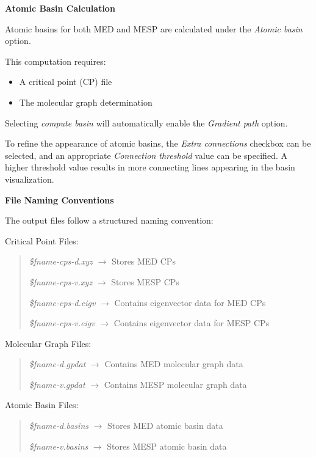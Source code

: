 \documentclass[10pt]{article}
\begin{document}
\vspace*{3mm}
{\bf Atomic Basin Calculation}
\vspace*{3mm}

Atomic basins
for both MED and MESP are calculated under the {\it Atomic basin} option.

This computation requires:

\begin{itemize}
\item A critical point (CP) file
\item The molecular graph determination
\end{itemize}

Selecting {\it compute basin} will automatically enable the {\it Gradient path} option.

To refine the appearance of atomic basins,
the {\it Extra connections} checkbox can be selected,
and an appropriate {\it Connection threshold} value can be specified.
A higher threshold value results in more connecting lines appearing in the basin visualization.

\vspace*{3mm}
{\bf File Naming Conventions}
\vspace*{3mm}

The output files follow a structured naming convention:

\begin{itemize}
\item Critical Point Files:
\vspace*{-5mm}
\begin{quote}
\item {\it \$fname-cps-d.xyz} $\rightarrow$ Stores MED CPs
\item {\it \$fname-cps-v.xyz} $\rightarrow$ Stores MESP CPs
\item {\it \$fname-cps-d.eigv} $\rightarrow$ Contains eigenvector data for MED CPs
\item {\it \$fname-cps-v.eigv} $\rightarrow$ Contains eigenvector data for MESP CPs
\end{quote}

\item Molecular Graph Files:
\vspace*{-5mm}
\begin{quote}
\item {\it \$fname-d.gpdat} $\rightarrow$ Contains MED molecular graph data
\item {\it \$fname-v.gpdat} $\rightarrow$ Contains MESP molecular graph data
\end{quote}

\item Atomic Basin Files:
\vspace*{-5mm}
\begin{quote}
\item {\it \$fname-d.basins} $\rightarrow$ Stores MED atomic basin data
\item {\it \$fname-v.basins} $\rightarrow$ Stores MESP atomic basin data
\end{quote}
\end{itemize}
\end{document}
